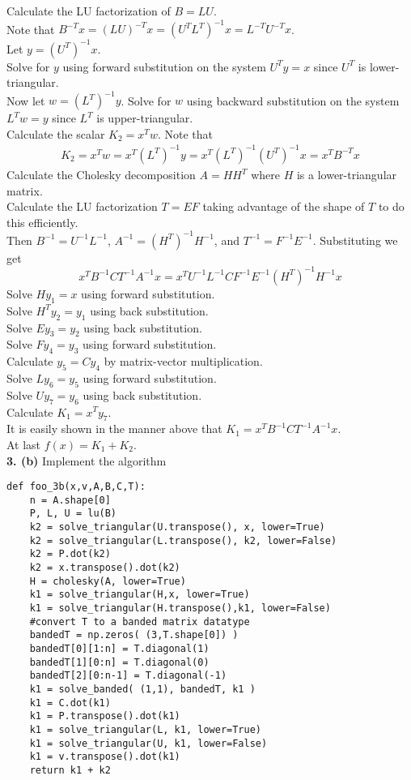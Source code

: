 \documentclass[12pt]{article}
\newcommand{\problem}[1]{\hspace{-4 ex} \large \textbf{#1}}
\begin{document}
	Calculate the LU factorization of $B = LU$. \\
	Note that $B^{-T}x = (LU)^{-T}x = (U^TL^T)^{-1}x = L^{-T}U^{-T}x$. \\
	Let $y = (U^T)^{-1}x$. \\
	Solve for $y$ using forward substitution on the system $U^Ty=x$ since $U^T$ is lower-triangular. \\
	Now let $w = (L^T)^{-1}y$. Solve for $w$ using backward substitution on the system $L^Tw=y$ since $L^T$ is upper-triangular. \\
	Calculate the scalar $K_2 = x^Tw$. Note that
	\begin{align*}
		K_2 = x^Tw = x^T(L^T)^{-1}y = x^T(L^T)^{-1}(U^T)^{-1}x = x^TB^{-T}x
	\end{align*}
	Calculate the Cholesky decomposition $A = HH^T$ where $H$ is a lower-triangular matrix. \\
	Calculate the LU factorization $T = EF$ taking advantage of the shape of $T$ to do this efficiently. \\
	Then $B^{-1} = U^{-1}L^{-1}$, $A^{-1}=(H^T)^{-1}H^{-1}$, and $T^{-1} = F^{-1}E^{-1}$. Substituting we get
	$$
	x^TB^{-1}CT^{-1}A^{-1}x = x^TU^{-1}L^{-1}CF^{-1}E^{-1}(H^T)^{-1}H^{-1}x
	$$
	Solve $Hy_1=x$ using forward substitution.\\
	Solve $H^Ty_2 = y_1$ using back substitution.\\
	Solve $E y_3 = y_2$ using back substitution. \\
	Solve $F y_4 = y_3$ using forward substitution. \\
	Calculate $y_5 = Cy_4$ by matrix-vector multiplication. \\
	Solve $L y_6 = y_5$ using forward substitution. \\
	Solve $U y_7 = y_6$ using back substitution. \\
	Calculate $K_1 = x^Ty_7$. \\
	It is easily shown in the manner above that $K_1 = x^TB^{-1}CT^{-1}A^{-1}x$.\\
	At last $f(x) = K_1 + K_2$.\\

\problem{3. (b)} Implement the algorithm \\
	\begin{lstlisting}
def foo_3b(x,v,A,B,C,T):
	n = A.shape[0]
	P, L, U = lu(B)
	k2 = solve_triangular(U.transpose(), x, lower=True)
	k2 = solve_triangular(L.transpose(), k2, lower=False)
	k2 = P.dot(k2)
	k2 = x.transpose().dot(k2)
	H = cholesky(A, lower=True)
	k1 = solve_triangular(H,x, lower=True)
	k1 = solve_triangular(H.transpose(),k1, lower=False)
	#convert T to a banded matrix datatype
	bandedT = np.zeros( (3,T.shape[0]) )
	bandedT[0][1:n] = T.diagonal(1)
	bandedT[1][0:n] = T.diagonal(0)
	bandedT[2][0:n-1] = T.diagonal(-1)
	k1 = solve_banded( (1,1), bandedT, k1 )
	k1 = C.dot(k1)
	k1 = P.transpose().dot(k1)
	k1 = solve_triangular(L, k1, lower=True)
	k1 = solve_triangular(U, k1, lower=False)
	k1 = v.transpose().dot(k1)
	return k1 + k2
	\end{lstlisting}
	
\end{document}
